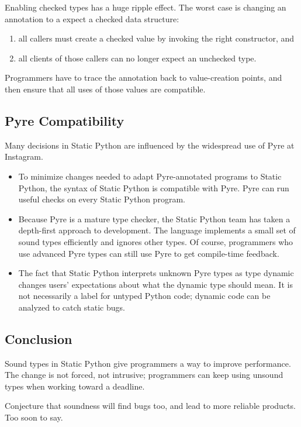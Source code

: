 \documentclass[english,cleveref,submission]{programming}
\newcommand{\SP}{Static Python}
\begin{document}
Enabling checked types has a huge ripple effect.
The worst case is changing an annotation to a expect a checked data structure:
\begin{enumerate}
  \item all callers must create a checked value by invoking the right constructor, and
  \item all clients of those callers can no longer expect an unchecked type.
\end{enumerate}
Programmers have to trace the annotation back to value-creation points, and then
ensure that all uses of those values are compatible.


\subsection{Pyre Compatibility}

Many decisions in \SP{} are influenced by the widespread use of Pyre at Instagram.
\begin{itemize}
  \item
    To minimize changes needed to adapt Pyre-annotated programs
    to \SP{}, the syntax of \SP{} is compatible with Pyre.
    Pyre can run useful checks on every \SP{} program.
  \item
    Because Pyre is a mature type checker, the \SP{} team has taken a
    depth-first approach to development.
    The language implements a small set of sound types efficiently and ignores
    other types.
    Of course, programmers who use advanced Pyre types can still use Pyre to
    get compile-time feedback.
  \item
    The fact that \SP{} interprets unknown Pyre types as type dynamic changes
    users' expectations about what the dynamic type should mean.
    It is not necessarily a label for untyped Python code; dynamic code
    can be analyzed to catch static bugs.
\end{itemize}


\subsection{Conclusion}

Sound types in Static Python give programmers a way to improve performance.
The change is not forced, not intrusive;
programmers can keep using unsound types when working toward a deadline.

Conjecture that soundness will find bugs too, and lead to more reliable products.
Too soon to say.
\end{document}

